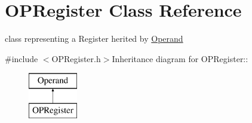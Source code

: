 \hypertarget{classOPRegister}{
\section{OPRegister Class Reference}
\label{classOPRegister}
}


class representing a Register herited by \hyperlink{classOperand}{Operand}  


{\ttfamily \#include $<$OPRegister.h$>$}Inheritance diagram for OPRegister::\begin{figure}[H]
\begin{center}
\leavevmode
\includegraphics[height=2cm]{classOPRegister}
\end{center}
\end{figure}
